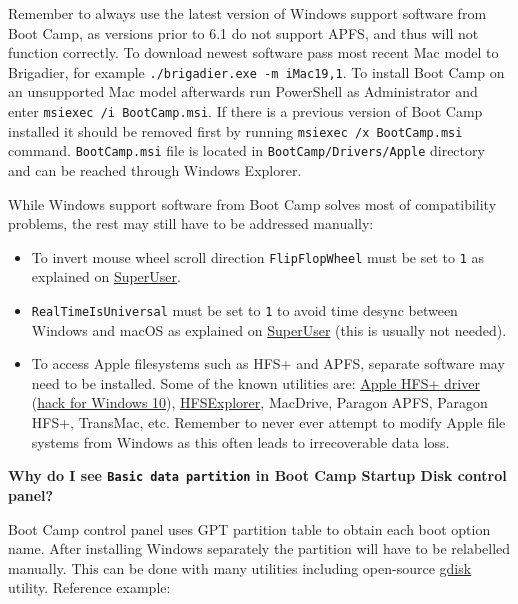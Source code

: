 \documentclass[]{article}
\begin{document}
  Remember to always use the latest version of Windows support software from Boot Camp,
  as versions prior to 6.1 do not support APFS, and thus will not function correctly.
  To download newest software pass most recent Mac model to Brigadier, for example
  \texttt{./brigadier.exe -m iMac19,1}. To install Boot Camp on an unsupported Mac model
  afterwards run PowerShell as Administrator and enter \texttt{msiexec /i BootCamp.msi}.
  If there is a previous version of Boot Camp installed it should be
  removed first by running \texttt{msiexec /x BootCamp.msi} command. \texttt{BootCamp.msi}
  file is located in \texttt{BootCamp/Drivers/Apple} directory and can be reached through
  Windows Explorer.

  While Windows support software from Boot Camp solves most of compatibility problems,
  the rest may still have to be addressed manually:

  \begin{itemize}
  \item To invert mouse wheel scroll direction \texttt{FlipFlopWheel} must be set
  to \texttt{1} as explained on \href{https://superuser.com/a/364353}{SuperUser}.
  \item \texttt{RealTimeIsUniversal} must be set to \texttt{1} to avoid time
  desync between Windows and macOS as explained on
  \href{https://superuser.com/q/494432}{SuperUser} (this is usually not needed).
  \item To access Apple filesystems such as HFS+ and APFS, separate software may need to
  be installed. Some of the known utilities are:
  \href{https://forums.macrumors.com/threads/apple-hfs-windows-driver-download.1368010/}{Apple HFS+ driver}
  (\href{https://forums.macrumors.com/threads/apple-hfs-windows-driver-download.1368010/post-24180079}{hack for Windows 10}),
  \href{http://www.catacombae.org/hfsexplorer}{HFSExplorer}, MacDrive, Paragon APFS,
  Paragon HFS+, TransMac, etc. Remember to never ever attempt to modify Apple file systems
  from Windows as this often leads to irrecoverable data loss.
  \end{itemize}

  \textbf{Why do I see \texttt{Basic data partition} in Boot Camp Startup Disk control panel?}

  Boot Camp control panel uses GPT partition table to obtain each boot option name.
  After installing Windows separately the partition will have to be relabelled manually.
  This can be done with many utilities including open-source
  \href{https://sourceforge.net/projects/gptfdisk}{gdisk} utility. Reference example:
\end{document}
